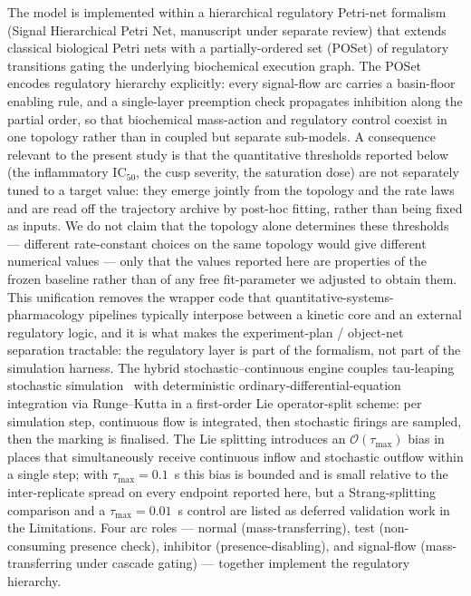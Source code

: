 \documentclass[10pt,letterpaper]{article}
\begin{document}
The model is implemented within a hierarchical regulatory Petri-net formalism (Signal Hierarchical Petri Net, manuscript under separate review) that extends classical biological Petri nets with a partially-ordered set (POSet) of regulatory transitions gating the underlying biochemical execution graph. The POSet encodes regulatory hierarchy explicitly: every signal-flow arc carries a basin-floor enabling rule, and a single-layer preemption check propagates inhibition along the partial order, so that biochemical mass-action and regulatory control coexist in one topology rather than in coupled but separate sub-models. A consequence relevant to the present study is that the quantitative thresholds reported below (the inflammatory IC$_{50}$, the cusp severity, the saturation dose) are not separately tuned to a target value: they emerge jointly from the topology and the rate laws and are read off the trajectory archive by post-hoc fitting, rather than being fixed as inputs. We do not claim that the topology alone determines these thresholds --- different rate-constant choices on the same topology would give different numerical values --- only that the values reported here are properties of the frozen baseline rather than of any free fit-parameter we adjusted to obtain them. This unification removes the wrapper code that quantitative-systems-pharmacology pipelines typically interpose between a kinetic core and an external regulatory logic, and it is what makes the experiment-plan / object-net separation tractable: the regulatory layer is part of the formalism, not part of the simulation harness. The hybrid stochastic--continuous engine couples tau-leaping stochastic simulation~\cite{gillespie2001tauleap} with deterministic ordinary-differential-equation integration via Runge--Kutta in a first-order Lie operator-split scheme: per simulation step, continuous flow is integrated, then stochastic firings are sampled, then the marking is finalised. The Lie splitting introduces an $\mathcal{O}(\tau_{\max})$ bias in places that simultaneously receive continuous inflow and stochastic outflow within a single step; with $\tau_{\max} = 0.1$~s this bias is bounded and is small relative to the inter-replicate spread on every endpoint reported here, but a Strang-splitting comparison and a $\tau_{\max} = 0.01$~s control are listed as deferred validation work in the Limitations. Four arc roles --- normal (mass-transferring), test (non-consuming presence check), inhibitor (presence-disabling), and signal-flow (mass-transferring under cascade gating) --- together implement the regulatory hierarchy.
\end{document}
